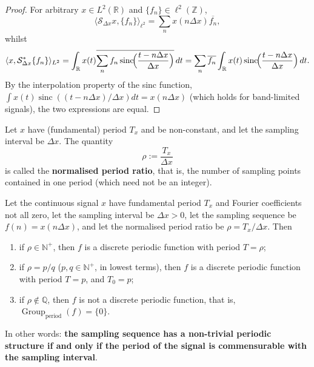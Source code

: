 \begin{proof}
For arbitrary $x\in L^2(\mathbb{R})$ and $\{f_n\}\in\ell^2(\mathbb{Z})$,
\[
\langle \mathcal{S}_{\Delta x}x,\{f_n\}\rangle_{\ell^2}=\sum_n x(n\Delta x)\overline{f_n},
\]
whilst
\[
\langle x,\mathcal{S}_{\Delta x}^*\{f_n\}\rangle_{L^2}=\int_{\mathbb{R}}x(t)\overline{\sum_n f_n\operatorname{sinc}\!\Bigl(\frac{t-n\Delta x}{\Delta x}\Bigr)}\,dt
=\sum_n\overline{f_n}\int_{\mathbb{R}}x(t)\operatorname{sinc}\!\Bigl(\frac{t-n\Delta x}{\Delta x}\Bigr)\,dt.
\]
By the interpolation property of the sinc function, $\int x(t)\operatorname{sinc}((t-n\Delta x)/\Delta x)dt=x(n\Delta x)$ (which holds for band-limited signals), the two expressions are equal.
\end{proof}

\begin{definition}\label{def:normalised_ratio_parallel}
Let $x$ have (fundamental) period $T_x$ and be non-constant, and let the sampling interval be $\Delta x$. The quantity
\[
\rho:=\frac{T_x}{\Delta x}
\]
is called the \textbf{normalised period ratio}, that is, the number of sampling points contained in one period (which need not be an integer).
\end{definition}

\begin{proposition}\label{prop:commensurability_periodicity_parallel}
Let the continuous signal $x$ have fundamental period $T_x$ and Fourier coefficients not all zero, let the sampling interval be $\Delta x>0$, let the sampling sequence be $f(n)=x(n\Delta x)$, and let the normalised period ratio be $\rho=T_x/\Delta x$. Then
\begin{enumerate}[label=(\roman*)]
    \item if $\rho\in\mathbb{N}^+$, then $f$ is a discrete periodic function with period $T=\rho$;
    \item if $\rho=p/q$ ($p,q\in\mathbb{N}^+$, in lowest terms), then $f$ is a discrete periodic function with period $T=p$, and $T_0=p$;
    \item if $\rho\notin\mathbb{Q}$, then $f$ is not a discrete periodic function, that is, $\operatorname{Group}_{\mathrm{period}}(f)=\{0\}$.
\end{enumerate}
In other words: \textbf{the sampling sequence has a non-trivial periodic structure if and only if the period of the signal is commensurable with the sampling interval}.
\end{proposition}

